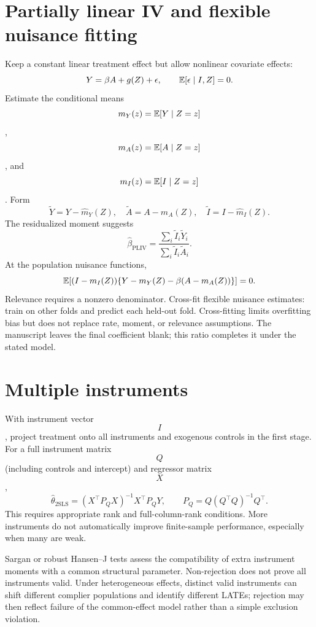 \section{Partially linear IV and flexible nuisance fitting}
Keep a constant linear treatment effect but allow nonlinear covariate effects:
\begin{equation}
Y=\beta A+g(Z)+\epsilon,\qquad \mathbb E[\epsilon\mid I,Z]=0.
\end{equation}
Estimate the conditional means $$m_Y(z)=\mathbb E[Y\mid Z=z]$$, $$m_A(z)=\mathbb E[A\mid Z=z]$$, and $$m_I(z)=\mathbb E[I\mid Z=z]$$. Form
\begin{equation}
\widetilde Y=Y-\widehat m_Y(Z),\quad
\widetilde A=A-\widehat m_A(Z),\quad
\widetilde I=I-\widehat m_I(Z).
\end{equation}
The residualized moment suggests
\begin{equation}
\widehat\beta_{\mathrm{PLIV}}=
\frac{\sum_i\widetilde I_i\widetilde Y_i}
{\sum_i\widetilde I_i\widetilde A_i}.
\end{equation}
At the population nuisance functions,
\begin{equation}
\mathbb E[(I-m_I(Z))\{Y-m_Y(Z)-\beta(A-m_A(Z))\}]=0.
\end{equation}
Relevance requires a nonzero denominator. Cross-fit flexible nuisance estimates: train on other folds and predict each held-out fold. Cross-fitting limits overfitting bias but does not replace rate, moment, or relevance assumptions. The manuscript leaves the final coefficient blank; this ratio completes it under the stated model.

\section{Multiple instruments}
With instrument vector $$I$$, project treatment onto all instruments and exogenous controls in the first stage. For a full instrument matrix $$Q$$ (including controls and intercept) and regressor matrix $$X$$,
\begin{equation}
\widehat\theta_{\mathrm{2SLS}}=(X^\top P_QX)^{-1}X^\top P_QY,
\qquad P_Q=Q(Q^\top Q)^{-1}Q^\top.
\end{equation}
This requires appropriate rank and full-column-rank conditions. More instruments do not automatically improve finite-sample performance, especially when many are weak.
\begin{supplement}
Sargan or robust Hansen--J tests assess the compatibility of extra instrument moments with a common structural parameter. Non-rejection does not prove all instruments valid. Under heterogeneous effects, distinct valid instruments can shift different complier populations and identify different LATEs; rejection may then reflect failure of the common-effect model rather than a simple exclusion violation.
\end{supplement}

